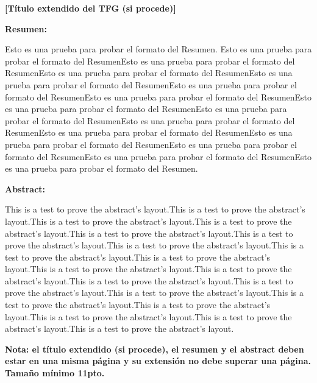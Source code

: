 \documentclass[11pt, a4paper]{article} %
\begin{document}
%    

\newpage


{\bfseries \large [Título extendido del TFG (si procede)] }\vspace{10mm} 

{\bfseries \large Resumen:} \vspace{5mm}

Esto es una prueba para probar el formato del Resumen. Esto es una prueba para probar el formato del ResumenEsto es una prueba para probar el formato del ResumenEsto es una prueba para probar el formato del ResumenEsto es una prueba para probar el formato del ResumenEsto es una prueba para probar el formato del ResumenEsto es una prueba para probar el formato del ResumenEsto es una prueba para probar el formato del ResumenEsto es una prueba para probar el formato del ResumenEsto es una prueba para probar el formato del ResumenEsto es una prueba para probar el formato del ResumenEsto es una prueba para probar el formato del ResumenEsto es una prueba para probar el formato del ResumenEsto es una prueba para probar el formato del ResumenEsto es una prueba para probar el formato del Resumen.
\vspace{1cm}

{\bfseries \large Abstract: }\vspace{5mm} 

This is a test to prove the abstract's layout.This is a test to prove the abstract's layout.This is a test to prove the abstract's layout.This is a test to prove the abstract's layout.This is a test to prove the abstract's layout.This is a test to prove the abstract's layout.This is a test to prove the abstract's layout.This is a test to prove the abstract's layout.This is a test to prove the abstract's layout.This is a test to prove the abstract's layout.This is a test to prove the abstract's layout.This is a test to prove the abstract's layout.This is a test to prove the abstract's layout.This is a test to prove the abstract's layout.This is a test to prove the abstract's layout.This is a test to prove the abstract's layout.This is a test to prove the abstract's layout.This is a test to prove the abstract's layout.This is a test to prove the abstract's layout.
\vspace{1cm}

{\Large\textbf{Nota: el título extendido (si procede), el resumen y el abstract deben estar en una misma página y su extensión no debe superar una página. Tamaño mínimo 11pto.}}
\vspace{1cm}
\end{document}
